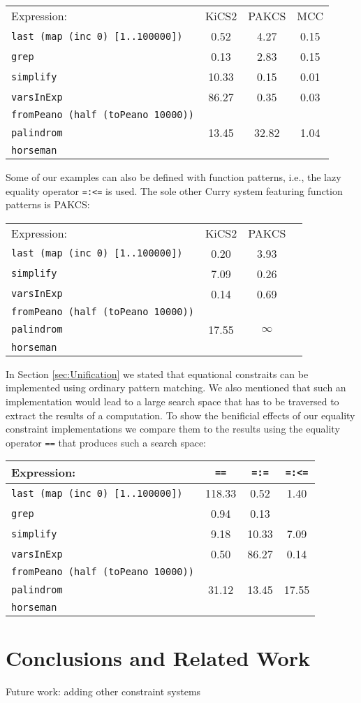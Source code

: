 \documentclass{llncs}
\newcommand{\code}[1]{\mbox{\small\texttt{#1}}}
\begin{document}
\begin{tabular}{|l|c|c|c|}
\hline
Expression: & KiCS2 & PAKCS & MCC \\
\code{last (map (inc 0) [1..100000])} &0.52 & 4.27&0.15 \\
\code{grep} & 0.13& 2.83& 0.15\\
\code{simplify} &10.33&0.15&0.01\\
\code{varsInExp} & 86.27 & 0.35  & 0.03\\
\code{fromPeano (half (toPeano 10000))} & &  & \\
\code{palindrom} & 13.45 &32.82 & 1.04\\
\code{horseman} & & &\\
\hline
\end{tabular}

Some of our examples can also be defined with function patterns, i.e.,
the lazy equality operator \code{=:<=} is used. The sole other
Curry system featuring function patterns is PAKCS:

\begin{tabular}{|l|c|c|c|}
\hline
Expression: & KiCS2 & PAKCS \\
\code{last (map (inc 0) [1..100000])} & 0.20& 3.93\\
\code{simplify}  &7.09&0.26&\\
\code{varsInExp} & 0.14 & 0.69\\
\code{fromPeano (half (toPeano 10000))} & &  \\
\code{palindrom} & 17.55 & $\infty$\\
\code{horseman} & & \\
\hline
\end{tabular}

In Section \ref{sec:Unification} we stated that equational
constraits can be implemented using ordinary pattern matching.
We also mentioned that such an implementation would lead to
a large search space that has to be traversed to extract
the results of a computation. To show the benificial effects
of our equality constraint implementations we compare them to
the results using the equality operator \code{==} that
produces such a search space:

\begin{tabular}{|l|c|c|c|}
\hline
Expression: &\code{==} & \code{=:=} & \code{=:<=}\\
\hline 
\code{last (map (inc 0) [1..100000])} & 118.33 & 0.52 & 1.40 \\
\code{grep} & 0.94 & 0.13 &\\
\code{simplify} & 9.18& 10.33 & 7.09\\
\code{varsInExp} & 0.50& 86.27 & 0.14\\
\code{fromPeano (half (toPeano 10000))} &  &  & \\
\code{palindrom} & 31.12&13.45 & 17.55\\
\code{horseman} & & & \\
\hline
\end{tabular}

 



\section{Conclusions and Related Work}
\label{sec:Conclusions}

Future work: adding other constraint systems




\end{document}
